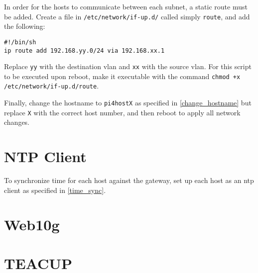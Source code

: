 In order for the hosts to communicate between each subnet, a static route must be added. Create a file in \lstinline{/etc/network/if-up.d/} called simply \lstinline{route}, and add the following:

\begin{verbatim}
#!/bin/sh
ip route add 192.168.yy.0/24 via 192.168.xx.1
\end{verbatim}

Replace \lstinline{yy} with the destination \gls{vlan} and \lstinline{xx} with the source \gls{vlan}. For this script to be executed upon reboot, make it executable with the command \lstinline{chmod +x /etc/network/if-up.d/route}.

Finally, change the hostname to \lstinline{pi4hostX} as specified in \ref{change_hostname} but replace \lstinline{X} with the correct host number, and then reboot to apply all network changes.


\section{NTP Client}

To synchronize time for each host against the gateway, set up each host as an \gls{ntp} client as specified in \ref{time_sync}.

\section{Web10g}



\section{TEACUP}

